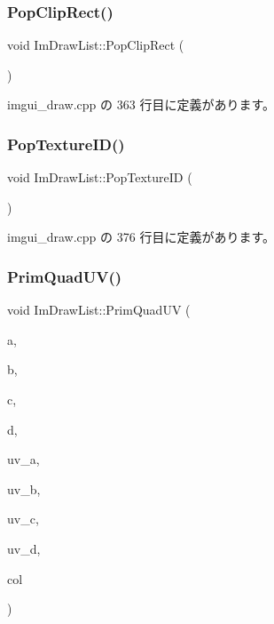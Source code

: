 \subsubsection{\texorpdfstring{Pop\+Clip\+Rect()}{PopClipRect()}}
{\footnotesize\ttfamily void Im\+Draw\+List\+::\+Pop\+Clip\+Rect (\begin{DoxyParamCaption}{ }\end{DoxyParamCaption})}



 imgui\+\_\+draw.\+cpp の 363 行目に定義があります。

\mbox{\label{struct_im_draw_list_ade9286c5ca58753f7bd571b30e2ff76c}} 
\subsubsection{\texorpdfstring{Pop\+Texture\+I\+D()}{PopTextureID()}}
{\footnotesize\ttfamily void Im\+Draw\+List\+::\+Pop\+Texture\+ID (\begin{DoxyParamCaption}{ }\end{DoxyParamCaption})}



 imgui\+\_\+draw.\+cpp の 376 行目に定義があります。

\mbox{\label{struct_im_draw_list_a9df27414aaca5f34ac3664a8b82582b5}} 
\subsubsection{\texorpdfstring{Prim\+Quad\+U\+V()}{PrimQuadUV()}}
{\footnotesize\ttfamily void Im\+Draw\+List\+::\+Prim\+Quad\+UV (\begin{DoxyParamCaption}\item[{const \mbox{\hyperlink{struct_im_vec2}{Im\+Vec2}} \&}]{a,  }\item[{const \mbox{\hyperlink{struct_im_vec2}{Im\+Vec2}} \&}]{b,  }\item[{const \mbox{\hyperlink{struct_im_vec2}{Im\+Vec2}} \&}]{c,  }\item[{const \mbox{\hyperlink{struct_im_vec2}{Im\+Vec2}} \&}]{d,  }\item[{const \mbox{\hyperlink{struct_im_vec2}{Im\+Vec2}} \&}]{uv\+\_\+a,  }\item[{const \mbox{\hyperlink{struct_im_vec2}{Im\+Vec2}} \&}]{uv\+\_\+b,  }\item[{const \mbox{\hyperlink{struct_im_vec2}{Im\+Vec2}} \&}]{uv\+\_\+c,  }\item[{const \mbox{\hyperlink{struct_im_vec2}{Im\+Vec2}} \&}]{uv\+\_\+d,  }\item[{\mbox{\hyperlink{imgui_8h_a118cff4eeb8d00e7d07ce3d6460eed36}{Im\+U32}}}]{col }\end{DoxyParamCaption})}



